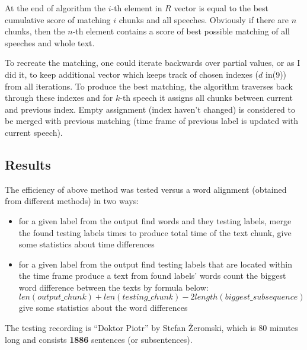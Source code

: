 \documentclass[12pt,a4paper,english]{article}
\begin{document}
\newpage
At the end of algorithm the $i$-th element in $R$ vector is equal to the best cumulative score of matching $i$ chunks and all speeches. Obviously if there are $n$ chunks, then the $n$-th element contains a score of best possible matching of all speeches and whole text. \newline

To recreate the matching, one could iterate backwards over partial values, or as I did it, to keep additional vector which keeps track of chosen indexes ($d$ in(9)) from all iterations. To produce the best matching, the algorithm traverses back through these indexes and for $k$-th speech it assigns all chunks between current and previous index. Empty assignment (index haven't changed) is considered to be merged with previous matching (time frame of previous label is updated with current speech). \newline
\newline

\subsection{Results}

The efficiency of above method was tested versus a word alignment (obtained from different methods) in two ways:
\begin{itemize}
    \item for a given label from the output find words and they testing labels, \newline
          merge the found testing labels times to produce total time of the text chunk, \newline
          give some statistics about time differences
    \item for a given label from the output find testing labels that are located within the time frame \newline
          produce a text from found labels' words \newline
          count the biggest word difference between the texts by formula below:
          \begin{equation}
               len(output\_chunk) + len(testing\_chunk) - 2 length(biggest\_subsequence)
          \end{equation}
          give some statistics about the word differences
\end{itemize}
The testing recording is “Doktor Piotr” by Stefan Żeromski, which is 80 minutes long and consists \textbf{1886} sentences (or subsentences). \newline
\end{document}
